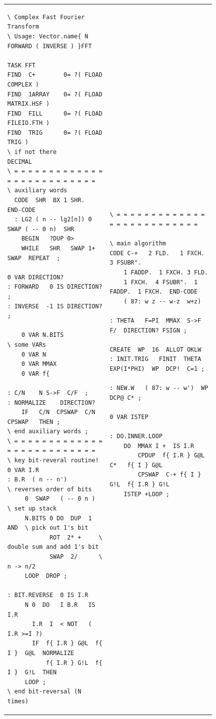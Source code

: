 \begin{figure}[H]
    \centering
    \scriptsize
    \setlength{\tabcolsep}{.4em}
    \begin{tabular}{l|l}
        \begin{lstlisting}
\ Complex Fast Fourier Transform
\ Usage: Vector.name{ N FORWARD ( INVERSE ) }FFT

TASK FFT
FIND  C+        0= ?( FLOAD COMPLEX )
FIND  1ARRAY    0= ?( FLOAD MATRIX.HSF )
FIND  FILL      0= ?( FLOAD FILEIO.FTH )
FIND  TRIG      0= ?( FLOAD TRIG )
\ if not there
DECIMAL
\ = = = = = = = = = = = = = = = = = = = = = = = = = =
\ auxiliary words
  CODE  SHR  BX 1 SHR.  END-CODE
  : LG2 ( n -- lg2[n]) 0 SWAP ( -- 0 n)  SHR
    BEGIN   ?DUP 0>
    WHILE   SHR   SWAP 1+  SWAP  REPEAT  ;

0 VAR DIRECTION?
: FORWARD   0 IS DIRECTION? ;
: INVERSE  -1 IS DIRECTION? ;

    0 VAR N.BITS            \ some VARs
    0 VAR N
    0 VAR MMAX
    0 VAR f{

: C/N    N S->F  C/F  ;
: NORMALIZE    DIRECTION?
    IF   C/N  CPSWAP  C/N   CPSWAP   THEN ;
\ end auxiliary words ;
\ = = = = = = = = = = = = = = = = = = = = = = = = = =
\ key bit-reveral routine!
0 VAR I.R
: B.R  ( n -- n')             \ reverses order of bits
     0  SWAP   ( -- 0 n )     \ set up stack
     N.BITS 0 DO  DUP  1 AND  \ pick out 1's bit
            ROT  2* +     \ double sum and add 1's bit
            SWAP  2/      \ n -> n/2
     LOOP  DROP ;

: BIT.REVERSE  0 IS I.R
     N 0  DO   I B.R   IS  I.R
       I.R  I  < NOT   ( I.R >=I ?)
       IF  f{ I.R } G@L  f{ I }  G@L  NORMALIZE
           f{ I.R } G!L  f{ I }  G!L  THEN
     LOOP ;
\ end bit-reversal (N times)
        \end{lstlisting}
      &
        \begin{lstlisting}
\ = = = = = = = = = = = = = = = = = = = = = = = = = =
                                    \ main algorithm
CODE C-+   2 FLD.   1 FXCH.  3 FSUBR".
    1 FADDP.  1 FXCH. 3 FLD.
    1 FXCH.  4 FSUBR".  1 FADDP.  1 FXCH.  END-CODE
    ( 87: w z -- w-z  w+z)

: THETA   F=PI  MMAX  S->F  F/  DIRECTION? FSIGN ;

CREATE  WP  16  ALLOT OKLW
: INIT.TRIG   FINIT  THETA  EXP(I*PHI)  WP  DCP!  C=1 ;

: NEW.W   ( 87: w -- w')  WP DCP@ C* ;

0 VAR ISTEP

: DO.INNER.LOOP
    DO  MMAX I +  IS I.R
        CPDUP  f{ I.R } G@L  C*   f{ I } G@L
        CPSWAP  C-+ f{ I } G!L  f{ I.R } G!L
    ISTEP +LOOP ;


\end{lstlisting}
\end{tabular}
\end{figure}
